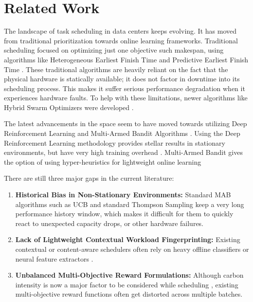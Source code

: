\section{Related Work}
\label{sec:rw}

The landscape of task scheduling in data centers keeps evolving. It has moved from traditional prioritization towards online learning frameworks. Traditional scheduling focused on optimizing just one objective such makespan, using algorithms like Heterogeneous Earliest Finish Time and Predictive Earliest Finish Time \citep{HosseiniShirvani2021A}. These traditional algorithms are heavily reliant on the fact that the physical hardware is statically available; it does not factor in downtime into its scheduling process. This makes it suffer serious performance degradation when it experiences hardware faults. To help with these limitations, newer algorithms like Hybrid Swarm Optimizers were developed \citep{Alkaam2025Hybrid}.

The latest advancements in the space seem to have moved towards utilizing Deep Reinforcement Learning and Multi-Armed Bandit Algorithms \citep{Khan2025Machine,DeCarvalho2025Toward}. Using the Deep Reinforcement Learning methodology provides stellar results in stationary environments, but have very high training overhead \citep{Choppara2025Efficient,Sravan2026DRL}. Multi-Armed Bandit gives the option of using hyper-heuristics for lightweight online learning \citep{Singh2024Leveraging}

There are still three major gaps in the current literature:
\begin{enumerate}
    \item \textbf{Historical Bias in Non-Stationary Environments:} Standard MAB algorithms such as UCB and standard Thompson Sampling keep a very long performance history window, which makes it difficult for them to quickly react to unexpected capacity drops, or other hardware failures.
    \item \textbf{Lack of Lightweight Contextual Workload Fingerprinting:} Existing contextual or content-aware schedulers often rely on heavy offline classifiers or neural feature extractors \citep{Adil2022scp}. 
    \item \textbf{Unbalanced Multi-Objective Reward Formulations:} Although carbon intensity is now a major factor to be considered while scheduling \citep{Arora2023Towards}, existing multi-objective reward functions often get distorted across multiple batches.
\end{enumerate}

